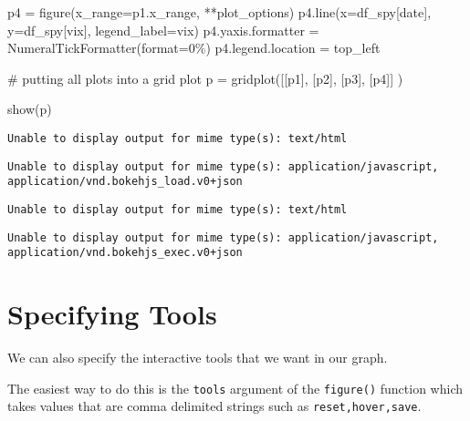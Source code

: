\documentclass[
  letterpaper,
  DIV=11,
  numbers=noendperiod]{scrreprt}
\newenvironment{Shaded}{\begin{snugshade}}{\end{snugshade}}
\newcommand{\BuiltInTok}[1]{\textcolor[rgb]{0.00,0.23,0.31}{#1}}
\newcommand{\CommentTok}[1]{\textcolor[rgb]{0.37,0.37,0.37}{#1}}
\newcommand{\NormalTok}[1]{\textcolor[rgb]{0.00,0.23,0.31}{#1}}
\newcommand{\OperatorTok}[1]{\textcolor[rgb]{0.37,0.37,0.37}{#1}}
\newcommand{\StringTok}[1]{\textcolor[rgb]{0.13,0.47,0.30}{#1}}
\begin{document}
\begin{Shaded}
\begin{Highlighting}[]
\NormalTok{p4 }\OperatorTok{=}\NormalTok{ figure(x\_range}\OperatorTok{=}\NormalTok{p1.x\_range, }\OperatorTok{**}\NormalTok{plot\_options)}
\NormalTok{p4.line(x}\OperatorTok{=}\NormalTok{df\_spy[}\StringTok{\textquotesingle{}date\textquotesingle{}}\NormalTok{], y}\OperatorTok{=}\NormalTok{df\_spy[}\StringTok{\textquotesingle{}vix\textquotesingle{}}\NormalTok{], legend\_label}\OperatorTok{=}\StringTok{\textquotesingle{}vix\textquotesingle{}}\NormalTok{)}
\NormalTok{p4.yaxis.formatter }\OperatorTok{=}\NormalTok{ NumeralTickFormatter(}\BuiltInTok{format}\OperatorTok{=}\StringTok{\textquotesingle{}0\%\textquotesingle{}}\NormalTok{)}
\NormalTok{p4.legend.location }\OperatorTok{=} \StringTok{\textquotesingle{}top\_left\textquotesingle{}}

\CommentTok{\# putting all plots into a grid plot}
\NormalTok{p }\OperatorTok{=}\NormalTok{ gridplot([[p1], }
\NormalTok{              [p2], }
\NormalTok{              [p3],}
\NormalTok{              [p4]]}
\NormalTok{            )}

\NormalTok{show(p)}
\end{Highlighting}
\end{Shaded}

\begin{verbatim}
Unable to display output for mime type(s): text/html
\end{verbatim}

\begin{verbatim}
Unable to display output for mime type(s): application/javascript, application/vnd.bokehjs_load.v0+json
\end{verbatim}

\begin{verbatim}
Unable to display output for mime type(s): text/html
\end{verbatim}

\begin{verbatim}
Unable to display output for mime type(s): application/javascript, application/vnd.bokehjs_exec.v0+json
\end{verbatim}

\hypertarget{specifying-tools}{%
\section{Specifying Tools}\label{specifying-tools}}

We can also specify the interactive tools that we want in our graph.

The easiest way to do this is the \texttt{tools} argument of the
\texttt{figure()} function which takes values that are comma delimited
strings such as
\texttt{\textquotesingle{}reset,hover,save\textquotesingle{}}.
\end{document}
